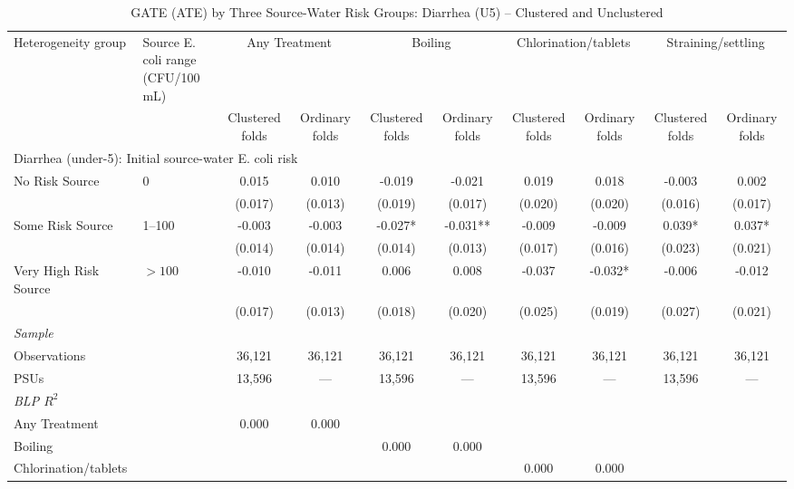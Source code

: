\begin{landscape}
\begin{table}[p]
\centering
\caption{GATE (ATE) by Three Source-Water Risk Groups: Diarrhea (U5) -- Clustered and Unclustered}
\label{tab:table_gate_appendix_risk_groups-diarrhea}
\scriptsize\setlength{\tabcolsep}{4pt}
\begin{adjustbox}{max width=\linewidth, center}
\begin{tabular}{llcccccccc}
\toprule
Heterogeneity group & \shortstack{Source E. coli range\\(CFU/100 mL)} & \multicolumn{2}{c}{Any Treatment} & \multicolumn{2}{c}{Boiling} & \multicolumn{2}{c}{Chlorination/tablets} & \multicolumn{2}{c}{Straining/settling} \\
 &  & Clustered folds & Ordinary folds & Clustered folds & Ordinary folds & Clustered folds & Ordinary folds & Clustered folds & Ordinary folds \\
\midrule
\multicolumn{10}{l}{Diarrhea (under-5): Initial source-water E. coli risk} \\
No Risk Source & 0 & 0.015 & 0.010 & -0.019 & -0.021 & 0.019 & 0.018 & -0.003 & 0.002 \\
 &  & (0.017) & (0.013) & (0.019) & (0.017) & (0.020) & (0.020) & (0.016) & (0.017) \\
Some Risk Source & 1--100 & -0.003 & -0.003 & -0.027* & -0.031** & -0.009 & -0.009 & 0.039* & 0.037* \\
 &  & (0.014) & (0.014) & (0.014) & (0.013) & (0.017) & (0.016) & (0.023) & (0.021) \\
Very High Risk Source & $>100$ & -0.010 & -0.011 & 0.006 & 0.008 & -0.037 & -0.032* & -0.006 & -0.012 \\
 &  & (0.017) & (0.013) & (0.018) & (0.020) & (0.025) & (0.019) & (0.027) & (0.021) \\
\multicolumn{10}{l}{\textit{Sample}} \\
\quad Observations &  & 36,121 & 36,121 & 36,121 & 36,121 & 36,121 & 36,121 & 36,121 & 36,121 \\
\quad PSUs &  & 13,596 & --- & 13,596 & --- & 13,596 & --- & 13,596 & --- \\
\multicolumn{10}{l}{\textit{BLP $R^{2}$}} \\
\quad Any Treatment &  & 0.000 & 0.000 &  &  &  &  &  &  \\
\quad Boiling &  &  &  & 0.000 & 0.000 &  &  &  &  \\
\quad Chlorination/tablets &  &  &  &  &  & 0.000 & 0.000 &  &  \\

\end{tabular}
\end{adjustbox}
\end{table}
\end{landscape}
